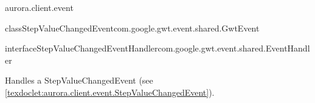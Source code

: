\begin{texdocpackage}{aurora.client.event}
\begin{texdocclass}{class}{StepValueChangedEvent}{com.google.gwt.event.shared.GwtEvent}{}
\label{texdoclet:aurora.client.event.StepValueChangedEvent}
\begin{texdocclassintro}
\end{texdocclassintro}
\begin{texdocclassfields}
\end{texdocclassfields}
\begin{texdocclassconstructors}
\end{texdocclassconstructors}
\begin{texdocclassmethods}
\end{texdocclassmethods}
\end{texdocclass}


\begin{texdocclass}{interface}{StepValueChangedEventHandler}{}{com.google.gwt.event.shared.EventHandler}
\label{texdoclet:aurora.client.event.StepValueChangedEventHandler}
\begin{texdocclassintro}
Handles a StepValueChangedEvent (see \ref{texdoclet:aurora.client.event.StepValueChangedEvent}).\end{texdocclassintro}
\begin{texdocclassmethods}
\end{texdocclassmethods}
\end{texdocclass}



\end{texdocpackage}
